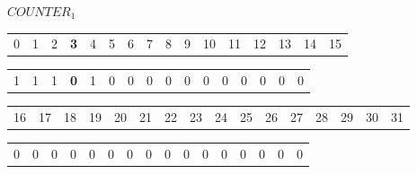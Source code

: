 \documentclass[a4paper,13pt]{article}
\theoremstyle{mytheor}
\begin{document}
\begin{mdframed}
    \vspace{0.25cm}
    $COUNTER_1$
    \begin{center}
        \begin{tabular}{p{0.4cm}p{0.4cm}p{0.4cm}p{0.4cm}p{0.4cm}p{0.4cm}p{0.4cm}p{0.4cm}p{0.4cm}p{0.4cm}p{0.4cm}p{0.4cm}p{0.4cm}p{0.4cm}p{0.4cm}p{0.4cm}}
            0 & 1 & 2 & \textbf{3} & 4 & 5 & 6 & 7 & 8 & 9 & 10 & 11 & 12 & 13 & 14 & 15 %
        \end{tabular}
        \begin{tabular}{|p{0.4cm}|p{0.4cm}|p{0.4cm}|p{0.4cm}|p{0.4cm}|p{0.4cm}|p{0.4cm}|p{0.4cm}|p{0.4cm}|p{0.4cm}|p{0.4cm}|p{0.4cm}|p{0.4cm}|p{0.4cm}|p{0.4cm}|p{0.4cm}|}
            \hline
            1 & 1 & 1 & \textbf{0} & 1 & 0 & 0 & 0 & 0 & 0 & 0 & 0 & 0 & 0 & 0 & 0 \\ \cline{1-16} %
        \end{tabular}
        \begin{tabular}{p{0.4cm}p{0.4cm}p{0.4cm}p{0.4cm}p{0.4cm}p{0.4cm}p{0.4cm}p{0.4cm}p{0.4cm}p{0.4cm}p{0.4cm}p{0.4cm}p{0.4cm}p{0.4cm}p{0.4cm}p{0.4cm}}
            16 & 17 & 18 & 19 & 20 & 21 & 22 & 23 & 24 & 25 & 26 & 27 & 28 & 29 & 30 & 31 %
        \end{tabular}
        \begin{tabular}{|p{0.4cm}|p{0.4cm}|p{0.4cm}|p{0.4cm}|p{0.4cm}|p{0.4cm}|p{0.4cm}|p{0.4cm}|p{0.4cm}|p{0.4cm}|p{0.4cm}|p{0.4cm}|p{0.4cm}|p{0.4cm}|p{0.4cm}|p{0.4cm}|}
            \hline
            0 & 0 & 0 & 0 & 0 & 0 & 0 & 0 & 0 & 0 & 0 & 0 & 0 & 0 & 0 & 0 \\ \cline{1-16} %
        \end{tabular}
    \end{center}
    

\end{mdframed}
\end{document}
